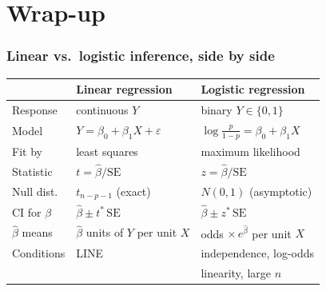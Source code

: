 \documentclass[slidestop,compress,mathserif]{beamer}
\begin{document}
\section{Wrap-up}
\begin{frame}
\frametitle{Linear vs.\ logistic inference, side by side}

{\small
\begin{center}
\renewcommand{\arraystretch}{1.25}
\begin{tabular}{lll}
\toprule
& \textbf{Linear regression} & \textbf{Logistic regression} \\
\midrule
Response & continuous $Y$ & binary $Y \in \{0,1\}$ \\
Model & $Y = \beta_0 + \beta_1 X + \varepsilon$ & $\log\frac{p}{1-p} = \beta_0 + \beta_1 X$ \\
Fit by & least squares & maximum likelihood \\
\midrule
Statistic & $t = \hat\beta / \mathrm{SE}$ & $z = \hat\beta / \mathrm{SE}$ \\
Null dist. & $t_{n-p-1}$ (exact) & $N(0,1)$ (asymptotic) \\
CI for $\beta$ & $\hat\beta \pm t^\ast\,\mathrm{SE}$ & $\hat\beta \pm z^\ast\,\mathrm{SE}$ \\
\midrule
$\hat\beta$ means & $\hat\beta$ units of $Y$ per unit $X$ & odds $\times\, e^{\hat\beta}$ per unit $X$ \\
Conditions & LINE & independence, log-odds \\
& & linearity, large $n$ \\
\bottomrule
\end{tabular}
\end{center}}

\end{frame}
\end{document}
